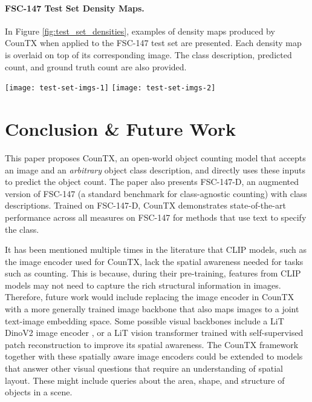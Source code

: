 \documentclass{bmvc2k}
\begin{document}
\paragraph{FSC-147 Test Set Density Maps.} In Figure \ref{fig:test_set_densities}, examples of density maps produced by CounTX when applied to the FSC-147 test set are presented. Each density map is overlaid on top of its corresponding image. The class description, predicted count, and ground truth count are also provided.
\begin{figure*}[h!]
\begin{center}
\texttt{[image: test-set-imgs-1]}
\texttt{[image: test-set-imgs-2]}
\end{center}\vspace{-6mm}
   \caption{Density maps produced by CounTX when applied to the FSC-147 test set.}
\label{fig:test_set_densities}
\end{figure*} \section{Conclusion \& Future Work}
This paper proposes CounTX, an open-world object counting model that accepts an image and an \emph{arbitrary} object class description, and directly uses these inputs to predict the object count. The paper also presents FSC-147-D, an augmented version of FSC-147 (a standard benchmark for class-agnostic counting) with class descriptions. Trained on FSC-147-D, CounTX demonstrates state-of-the-art performance across all measures on FSC-147 for methods that use text to specify the class. 

It has been mentioned multiple times in the literature \cite{lit, oquab2023dinov2, paiss2023countclip} that CLIP models, such as the image encoder used for CounTX, lack the spatial awareness needed for tasks such as counting. This is because, during their pre-training, features from CLIP models may not need to capture the rich structural information in images. Therefore, future work would include replacing the image encoder in CounTX with a more generally trained image backbone that also maps images to a joint text-image embedding space. Some possible visual backbones include a LiT DinoV2 image encoder \cite{lit, oquab2023dinov2}, or a LiT vision transformer trained with self-supervised patch reconstruction to improve its spatial awareness. The CounTX framework together with these spatially aware image encoders could be extended to models that answer other visual questions that require an understanding of spatial layout. These might include queries about the area, shape, and structure of objects in a scene.
\end{document}
